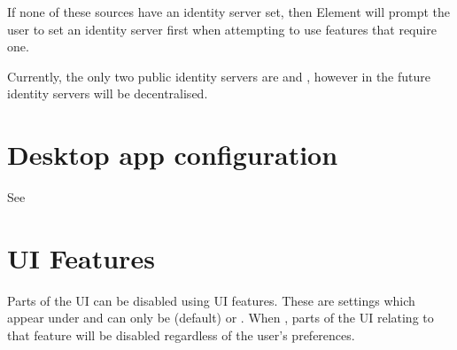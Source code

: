 \documentclass[letterpaper,10pt,openany,oneside,english]{sphinxmanual}
\begin{document}
\sphinxAtStartPar
If none of these sources have an identity server set, then Element will prompt the
user to set an identity server first when attempting to use features that
require one.

\sphinxAtStartPar
Currently, the only two public identity servers are  and
, however in the future identity servers will be
decentralised.


\section{Desktop app configuration}
\label{\detokenize{config:desktop-app-configuration}}
\sphinxAtStartPar
See 


\section{UI Features}
\label{\detokenize{config:ui-features}}
\sphinxAtStartPar
Parts of the UI can be disabled using UI features. These are settings which appear
under  and can only be  (default) or . When ,
parts of the UI relating to that feature will be disabled regardless of the user’s
preferences.
\end{document}
